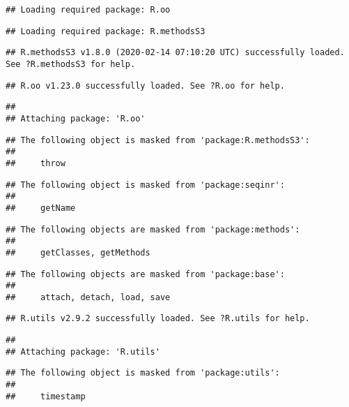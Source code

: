 \documentclass[]{article}
\begin{document}
\begin{verbatim}
## Loading required package: R.oo
\end{verbatim}

\begin{verbatim}
## Loading required package: R.methodsS3
\end{verbatim}

\begin{verbatim}
## R.methodsS3 v1.8.0 (2020-02-14 07:10:20 UTC) successfully loaded. See ?R.methodsS3 for help.
\end{verbatim}

\begin{verbatim}
## R.oo v1.23.0 successfully loaded. See ?R.oo for help.
\end{verbatim}

\begin{verbatim}
## 
## Attaching package: 'R.oo'
\end{verbatim}

\begin{verbatim}
## The following object is masked from 'package:R.methodsS3':
## 
##     throw
\end{verbatim}

\begin{verbatim}
## The following object is masked from 'package:seqinr':
## 
##     getName
\end{verbatim}

\begin{verbatim}
## The following objects are masked from 'package:methods':
## 
##     getClasses, getMethods
\end{verbatim}

\begin{verbatim}
## The following objects are masked from 'package:base':
## 
##     attach, detach, load, save
\end{verbatim}

\begin{verbatim}
## R.utils v2.9.2 successfully loaded. See ?R.utils for help.
\end{verbatim}

\begin{verbatim}
## 
## Attaching package: 'R.utils'
\end{verbatim}

\begin{verbatim}
## The following object is masked from 'package:utils':
## 
##     timestamp
\end{verbatim}
\end{document}
